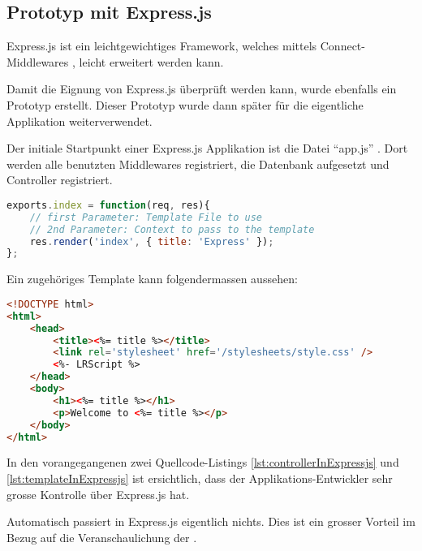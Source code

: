 \subsection{Prototyp mit Express.js}

Express.js \cite{Expressjs} ist ein leichtgewichtiges Framework, welches mittels Connect-Middlewares \cite{connect}, leicht erweitert werden kann.

Damit die Eignung von Express.js überprüft werden kann, wurde ebenfalls ein Prototyp \cite{ExpressjsPrototyp} erstellt.  Dieser Prototyp wurde dann später für die eigentliche Applikation weiterverwendet.

Der initiale Startpunkt einer Express.js Applikation ist die Datei ``app.js'' \cite{ExpressjsPrototypAppjs}. Dort werden alle benutzten Middlewares registriert, die Datenbank aufgesetzt und Controller registriert.

\begin{lstlisting}[language=JavaScript, caption=Beispiel eines Controllers in Express.js, label=lst:controllerInExpressjs]
exports.index = function(req, res){
	// first Parameter: Template File to use
	// 2nd Parameter: Context to pass to the template
	res.render('index', { title: 'Express' });
};
\end{lstlisting}

Ein zugehöriges Template kann folgendermassen aussehen:

\begin{lstlisting}[language=HTML, caption=Template in Express.js, label=lst:templateInExpressjs]
<!DOCTYPE html>
<html>
	<head>
		<title><%= title %></title>
		<link rel='stylesheet' href='/stylesheets/style.css' />
		<%- LRScript %>
	</head>
	<body>
		<h1><%= title %></h1>
		<p>Welcome to <%= title %></p>
	</body>
</html>
\end{lstlisting}

In den vorangegangenen zwei Quellcode-Listings \ref{lst:controllerInExpressjs} und \ref{lst:templateInExpressjs} ist ersichtlich, dass der Applikations-Entwickler sehr grosse Kontrolle über Express.js hat.

Automatisch passiert in Express.js eigentlich nichts. Dies ist ein grosser Vorteil im Bezug auf die Veranschaulichung der .